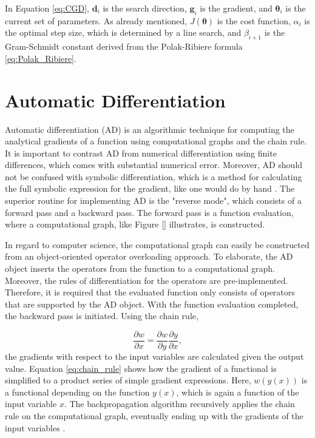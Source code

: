 In Equation \eqref{eq:CGD}, $\bm{d}_{i}$ is the search direction, $\bm{g}_{i}$ is the gradient, and $\bm{\theta}_{i}$ is the current set of parameters.
As already mentioned, $J(\bm{\theta})$ is the cost function, $\alpha_{i}$ is the optimal step size, which is determined by a line search, and $\beta_{i+1}$ is the Gram-Schmidt constant derived from the Polak-Ribiere formula \eqref{eq:Polak_Ribiere}.




\section{Automatic Differentiation}\label{sec:theory_AD}
\noindent
Automatic differentiation (AD) is an algorithmic technique for computing the analytical gradients of a function using computational graphs and the chain rule.
It is important to contrast AD from numerical differentiation using finite differences, which comes with substantial numerical error.
Moreover, AD should not be confused with symbolic differentiation, which is a method for calculating the full symbolic expression for the gradient, like one would do by hand \cite{baydin2018automatic}.
The superior routine for implementing AD is the "reverse mode", which consists of a forward pass and a backward pass.
The forward pass is a function evaluation, where a computational graph, like Figure \ref{} illustrates, is constructed.


In regard to computer science, the computational graph can easily be constructed from an object-oriented operator overloading approach.
To elaborate, the AD object inserts the operators from the function to a computational graph.
Moreover, the rules of differentiation for the operators are pre-implemented.
Therefore, it is required that the evaluated function only consists of operators that are supported by the AD object.
With the function evaluation completed, the backward pass is initiated. Using the chain rule,

\begin{equation}\label{eq:chain_rule}
    \frac{\partial w}{\partial x} = \frac{\partial w}{\partial y} \frac{\partial y}{\partial x},
\end{equation}
the gradients with respect to the input variables are calculated given the output value.
Equation \eqref{eq:chain_rule} shows how the gradient of a functional is simplified to a product series of simple gradient expressions.
Here, $w(y(x))$ is a functional depending on the function $y(x)$, which is again a function of the input variable $x$.
The backpropagation algorithm recursively applies the chain rule on the computational graph, eventually ending up with the gradients of the input variables \cite{baydin2018automatic}.

